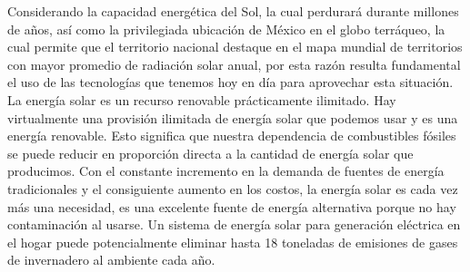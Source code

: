 Considerando la capacidad energética del Sol, la cual perdurará durante millones de años, así como la privilegiada ubicación de
México en el globo terráqueo, la cual permite que el territorio nacional destaque en el mapa mundial de territorios con mayor
promedio de radiación solar anual, por esta razón resulta fundamental el uso de las tecnologías que tenemos hoy en día para
aprovechar esta situación.
La energía solar es un recurso renovable prácticamente ilimitado. Hay virtualmente una provisión ilimitada de energía solar que
podemos usar y es una energía renovable. Esto significa que nuestra dependencia de combustibles fósiles se puede reducir en
proporción directa a la cantidad de energía solar que producimos. Con el constante incremento en la demanda de fuentes de energía
tradicionales y el consiguiente aumento en los costos, la energía solar es cada vez más una necesidad, es una excelente fuente de
energía alternativa porque no hay contaminación al usarse.
Un sistema de energía solar para generación eléctrica en el hogar puede potencialmente eliminar hasta 18 toneladas de emisiones
de gases de invernadero al ambiente cada año. \\








